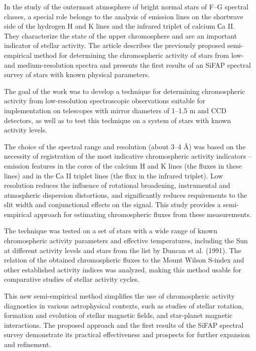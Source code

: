 In the study of the outermost atmosphere of bright normal stars of F--G spectral classes, a special role belongs to the analysis of emission lines on the shortwave side of the hydrogen H and K lines and the infrared triplet of calcium Сa II. They characterize the state of the upper chromosphere and are an important indicator of stellar activity. The article describes the previously proposed semi-empirical method for determining the chromospheric activity of stars from low- and medium-resolution spectra and presents the first results of an SiFAP spectral survey of stars with known physical parameters.

The goal of the work was to develop a technique for determining chromospheric activity from low-resolution spectroscopic observations suitable for implementation on telescopes with mirror diameters of 1--1.5 m and CCD detectors, as well as to test this technique on a system of stars with known activity levels.

The choice of the spectral range and resolution (about 3--4 Å) was based on the necessity of registration of the most indicative chromospheric activity indicators -- emission features in the cores of the calcium H and K lines (the fluxes in these lines) and in the Сa II triplet lines (the flux in the infrared triplet). Low resolution reduces the influence of rotational broadening, instrumental and atmospheric dispersion distortions, and significantly reduces requirements to the slit width and conjunctional effects on the signal. This study provides a semi-empirical approach for estimating chromospheric fluxes from these measurements.

The technique was tested on a set of stars with a wide range of known chromospheric activity parameters and effective temperatures, including the Sun at different activity levels and stars from the list by Duncan et al. (1991). The relation of the obtained chromospheric fluxes to the Mount Wilson S-index and other established activity indices was analyzed, making this method usable for comparative studies of stellar activity cycles.

This new semi-empirical method simplifies the use of chromospheric activity diagnostics in various astrophysical contexts, such as studies of stellar rotation, formation and evolution of stellar magnetic fields, and star-planet magnetic interactions. The proposed approach and the first results of the SiFAP spectral survey demonstrate its practical effectiveness and prospects for further expansion and refinement.